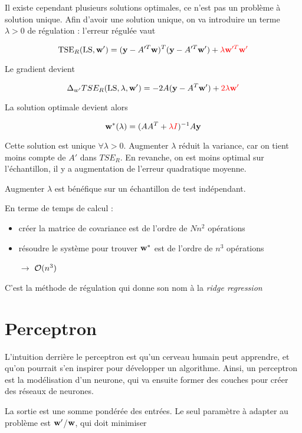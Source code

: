 		
	Il existe cependant plusieurs solutions optimales, ce n'est pas un problème à solution unique. Afin d'avoir une solution unique, on va introduire un terme $\lambda > 0$ de régulation : l'erreur régulée vaut
	
	$$\text{TSE}_R(\text{LS}, \textbf{w}') = (\textbf{y} - A'^T\textbf{w})^T(\textbf{y} - A'^T\textbf{w}') + \textcolor{red}{\lambda \textbf{w}'^T\textbf{w}'}$$
	
	Le gradient devient
	
	$$\Delta_{w'} TSE_R(\text{LS}, \lambda, \textbf{w}') = -2 A (\textbf{y} - A^T\textbf{w}') + \textcolor{red}{2 \lambda \textbf{w}'}$$
	
	La solution optimale devient alors
	
	$$\textbf{w}^*(\lambda) = (A A^T + \textcolor{red}{\lambda I})^{-1} A \textbf{y}$$
	
	Cette solution est unique $\forall \lambda > 0$. Augmenter $\lambda$ réduit la variance, car on tient moins compte de $A'$ dans $TSE_R$. En revanche, on est moins optimal sur l'échantillon, il y a augmentation de l'erreur quadratique moyenne.
		
		
	Augmenter $\lambda$ est bénéfique sur un échantillon de test indépendant.
	
	En terme de temps de calcul :
	
	\begin{itemize}
		\item créer la matrice de covariance est de l'ordre de $N n^2$ opérations
		\item résoudre le système pour trouver $\textbf{w}^*$ est de l'ordre de $n^3$ opérations
		\item[$\rightarrow$] $\mathcal{O}(n^3)$
	\end{itemize}
	
	
	C'est la méthode de régulation qui donne son nom à la \textit{ridge regression}
	
	
\section{Perceptron}
	
L'intuition derrière le perceptron est qu'un cerveau humain peut apprendre, et qu'on pourrait s'en inspirer pour développer un algorithme. Ainsi, un perceptron est la modélisation d'un neurone, qui va ensuite former des couches pour créer des réseaux de neurones.
	
	
La sortie est une somme pondérée des entrées. Le seul paramètre à adapter au problème est $\textbf{w}'$/$\textbf{w}$, qui doit minimiser
	
